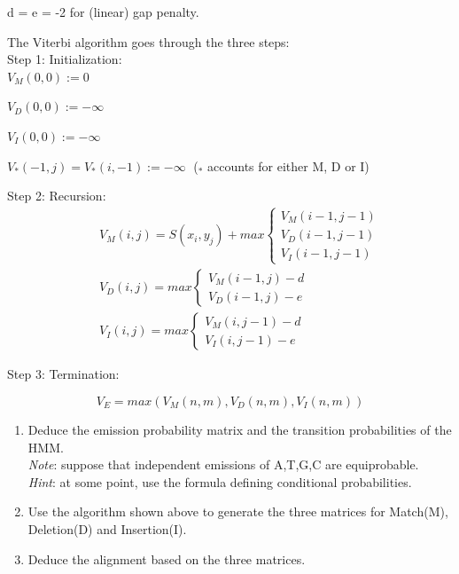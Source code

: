 \documentclass[a4paper,11pt]{article}
\begin{document}
d = e = -2 for (linear) gap penalty.

\newpage
The Viterbi algorithm goes through the three steps:\\


Step 1: Initialization:\\

$V_M(0,0):=0$

$V_D(0,0):=-\infty$

$V_I(0,0):=-\infty$

$V_*(-1,j)=V_*(i,-1):=-\infty \;$ ($_*$ accounts for either M, D or I)
\vspace{0.5cm}

Step 2: Recursion:
\begin{eqnarray}
&&
V_M(i,j) =S(x_{i},y_{j})+max 
	\left\{ \begin{array}{l}
	 V_M(i-1,j-1) \\
     V_D(i-1,j-1) \\
     V_I(i-1,j-1)
    \end{array} \right.\nonumber\\
&&
V_D(i,j) =max \left\{ 
    \begin{array}{ll}
     V_M(i-1,j)-d \\
     V_D(i-1,j)-e 
    \end{array} \right.\nonumber\\
&&
V_I(i,j) =max \left\{ 
    \begin{array}{ll}
     V_M(i,j-1)-d\\
     V_I(i,j-1)-e
    \end{array} \right.\nonumber
\end{eqnarray}


Step 3: Termination:

$$V_E=max(V_M(n,m),V_D(n,m),V_I(n,m))$$


\begin{enumerate}
\item Deduce the emission probability matrix and the transition probabilities of the HMM.\\
	\textit{Note}: suppose that independent emissions of A,T,G,C are equiprobable.\\
	\textit{Hint}: at some point, use the formula defining conditional probabilities.
\item Use the algorithm shown above to generate the three matrices for Match(M), Deletion(D) and Insertion(I).
\item Deduce the alignment based on the three matrices.
\end{enumerate}
\end{document}
